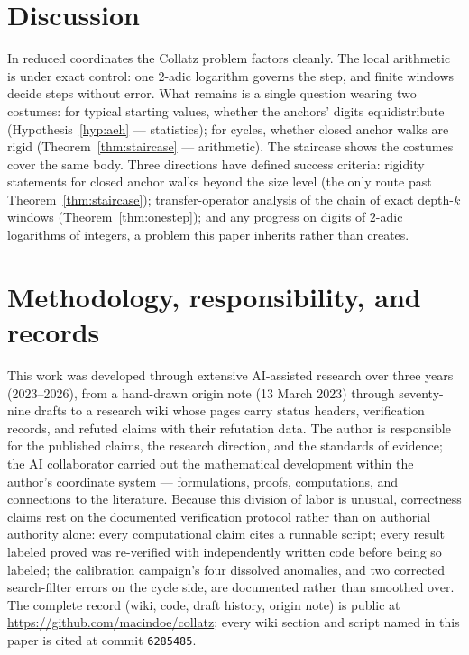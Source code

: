 \documentclass[11pt]{article}
\theoremstyle{remark}
\begin{document}
\section{Discussion}

In reduced coordinates the Collatz problem factors cleanly. The local arithmetic is under exact control: one $2$-adic logarithm governs the step, and finite windows decide steps without error. What remains is a single question wearing two costumes: for typical starting values, whether the anchors' digits equidistribute (Hypothesis~\ref{hyp:aeh} --- statistics); for cycles, whether closed anchor walks are rigid (Theorem~\ref{thm:staircase} --- arithmetic). The staircase shows the costumes cover the same body. Three directions have defined success criteria: rigidity statements for closed anchor walks beyond the size level (the only route past Theorem~\ref{thm:staircase}); transfer-operator analysis of the chain of exact depth-$k$ windows (Theorem~\ref{thm:onestep}); and any progress on digits of $2$-adic logarithms of integers, a problem this paper inherits rather than creates.

\appendix
\section{Methodology, responsibility, and records}\label{app:method}
This work was developed through extensive AI-assisted research over three years (2023--2026), from a hand-drawn origin note (13 March 2023) through seventy-nine drafts to a research wiki whose pages carry status headers, verification records, and refuted claims with their refutation data. The author is responsible for the published claims, the research direction, and the standards of evidence; the AI collaborator carried out the mathematical development within the author's coordinate system --- formulations, proofs, computations, and connections to the literature. Because this division of labor is unusual, correctness claims rest on the documented verification protocol rather than on authorial authority alone: every computational claim cites a runnable script; every result labeled proved was re-verified with independently written code before being so labeled; the calibration campaign's four dissolved anomalies, and two corrected search-filter errors on the cycle side, are documented rather than smoothed over. The complete record (wiki, code, draft history, origin note) is public at \url{https://github.com/macindoe/collatz}; every wiki section and script named in this paper is cited at commit \texttt{6285485}.
\end{document}
